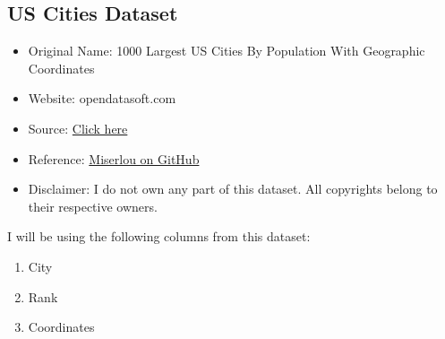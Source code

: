 \documentclass[12pt, a4paper]{article}
\begin{document}
\subsection*{US Cities Dataset}
\begin{itemize}
	\item Original Name: 1000 Largest US Cities By Population With Geographic Coordinates
	\item Website: opendatasoft.com
	\item Source: \href{https://public.opendatasoft.com/explore/dataset/1000-largest-us-cities-by-population-with-geographic-coordinates/export/?sort=-rank&dataChart=eyJxdWVyaWVzIjpbeyJjb25maWciOnsiZGF0YXNldCI6IjEwMDAtbGFyZ2VzdC11cy1jaXRpZXMtYnktcG9wdWxhdGlvbi13aXRoLWdlb2dyYXBoaWMtY29vcmRpbmF0ZXMiLCJvcHRpb25zIjp7InNvcnQiOiItcmFuayJ9fSwiY2hhcnRzIjpbeyJhbGlnbk1vbnRoIjp0cnVlLCJ0eXBlIjoiY29sdW1uIiwiZnVuYyI6IkFWRyIsInlBeGlzIjoicmFuayIsInNjaWVudGlmaWNEaXNwbGF5Ijp0cnVlLCJjb2xvciI6IiNGRjUxNUEifV0sInhBeGlzIjoiY2l0eSIsIm1heHBvaW50cyI6NTAsInNvcnQiOiIifV0sInRpbWVzY2FsZSI6IiIsImRpc3BsYXlMZWdlbmQiOnRydWUsImFsaWduTW9udGgiOnRydWV9}{Click here}
	\item Reference: \href{https://gist.github.com/Miserlou/c5cd8364bf9b2420bb29#file-cities-json}{Miserlou on GitHub} 
	\item Disclaimer: I do not own any part of this dataset. All copyrights belong to their respective owners. 
\end{itemize}
I will be using the following columns from this dataset:
\begin{enumerate}
	\item City
	\item Rank
	\item Coordinates 
\end{enumerate}
	
\end{document}

